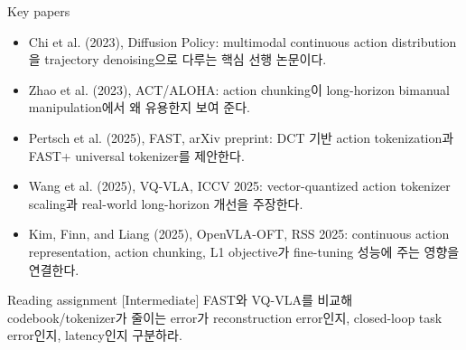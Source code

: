 \begin{sourcebox}{Key papers}
\begin{itemize}
  \item Chi et al. (2023), Diffusion Policy: multimodal continuous action distribution을 trajectory denoising으로 다루는 핵심 선행 논문이다.
  \item Zhao et al. (2023), ACT/ALOHA: action chunking이 long-horizon bimanual manipulation에서 왜 유용한지 보여 준다.
  \item Pertsch et al. (2025), FAST, arXiv preprint: DCT 기반 action tokenization과 FAST+ universal tokenizer를 제안한다.
  \item Wang et al. (2025), VQ-VLA, ICCV 2025: vector-quantized action tokenizer scaling과 real-world long-horizon 개선을 주장한다.
  \item Kim, Finn, and Liang (2025), OpenVLA-OFT, RSS 2025: continuous action representation, action chunking, L1 objective가 fine-tuning 성능에 주는 영향을 연결한다.
\end{itemize}
\end{sourcebox}

\begin{assignmentbox}{Reading assignment [Intermediate]}
FAST와 VQ-VLA를 비교해 codebook/tokenizer가 줄이는 error가 reconstruction error인지, closed-loop task error인지, latency인지 구분하라.
\end{assignmentbox}
